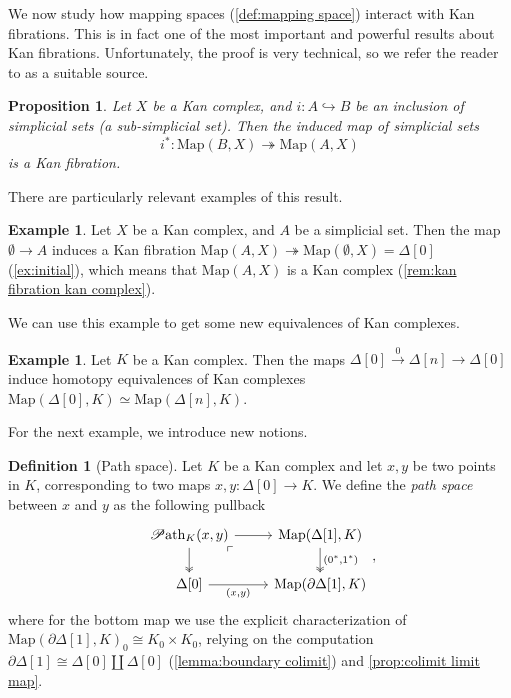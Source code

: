 \documentclass[11pt, a4paper]{amsart}
\newcommand{\Map}{\mathrm{Map}}
\newcommand{\Path}{\mathscr{P}\mathrm{ath}}
\newtheorem{proposition}[equation]{Proposition}
\theoremstyle{definition}
\newtheorem{definition}[equation]{Definition}
\newtheorem{example}[equation]{Example}
\theoremstyle{remark}
\numberwithin{equation}{section}
\begin{document}
We now study how mapping spaces (\cref{def:mapping space}) interact with Kan fibrations. This is in fact one of the most important and powerful results about Kan fibrations. Unfortunately, the proof is very technical, so we refer the reader to \cite[Corollary 5.3]{goerssjardine2009simplicialhomotopytheory} as a suitable source.

\begin{proposition} \label{prop:kan fibration mapping space}
  Let $X$ be a Kan complex, and $i\colon A \hookrightarrow B$ be an inclusion of simplicial sets (a sub-simplicial set). Then the induced map of simplicial sets
  \[i^*\colon \Map(B,X) \twoheadrightarrow \Map(A,X)\]
  is a Kan fibration.
\end{proposition}

There are particularly relevant examples of this result.

\begin{example} \label{ex:map kan complex}
  Let $X$ be a Kan complex, and $A$ be a simplicial set. Then the map $\emptyset \to A$ induces a Kan fibration $\Map(A,X) \twoheadrightarrow \Map(\emptyset,X) = \Delta[0]$ (\cref{ex:initial}), which means that $\Map(A,X)$ is a Kan complex (\cref{rem:kan fibration kan complex}).
\end{example}

We can use this example to get some new equivalences of Kan complexes.

\begin{example} \label{ex:map kan complex equivalence}
  Let $K$ be a Kan complex. Then the maps $\Delta[0] \xrightarrow{ 0 } \Delta[n] \to \Delta[0]$ induce homotopy equivalences of Kan complexes $\Map(\Delta[0], K) \simeq \Map(\Delta[n], K)$.
\end{example}


For the next example, we introduce new notions.

\begin{definition}[Path space] \label{def:path space}
  Let $K$ be a Kan complex and let $x,y$ be two points in $K$, corresponding to two maps $x,y \colon \Delta[0] \to K$. We define the \emph{path space} between $x$ and $y$ as the following pullback
  \[
  \begin{tikzcd}
   \Path_K(x,y) \arrow[dr, phantom, "\ulcorner", very near start] \arrow[r] \arrow[d, twoheadrightarrow] & \Map(\Delta[1],K) \arrow[d, "{(0^* , 1^*)}", twoheadrightarrow] \\
   \Delta[0] \arrow[r, "{(x , y)}"'] & \Map(\partial \Delta[1],K)
  \end{tikzcd},
  \]
  where for the bottom map we use the explicit characterization of $\Map(\partial \Delta[1],K)_0 \cong K_0 \times K_0$, relying on the computation $\partial \Delta[1] \cong \Delta[0] \coprod \Delta[0]$ (\cref{lemma:boundary colimit}) and \cref{prop:colimit limit map}.
 \end{definition}
\end{document}
